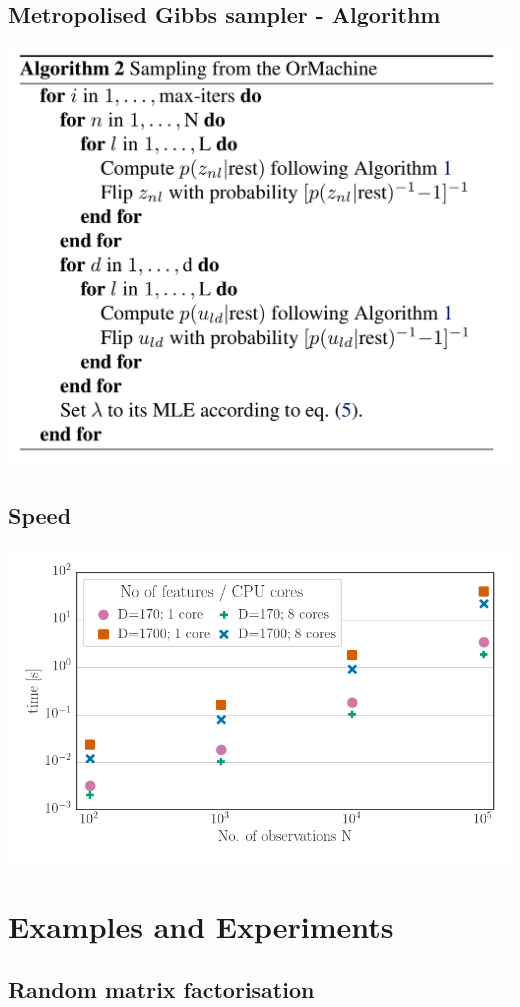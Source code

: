 \documentclass[11pt]{article}
\begin{document}
\subsection*{Metropolised Gibbs sampler - Algorithm}
\label{sec-3-4}
\includegraphics[width=.9\linewidth]{./alg2.png}
\subsection*{Speed}
\label{sec-3-5}
\includegraphics[width=.9\linewidth]{./scaling_parallel.png}
\section*{Examples and Experiments}
\label{sec-4}
\subsection*{Random matrix factorisation}
\label{sec-4-1}
\end{document}
